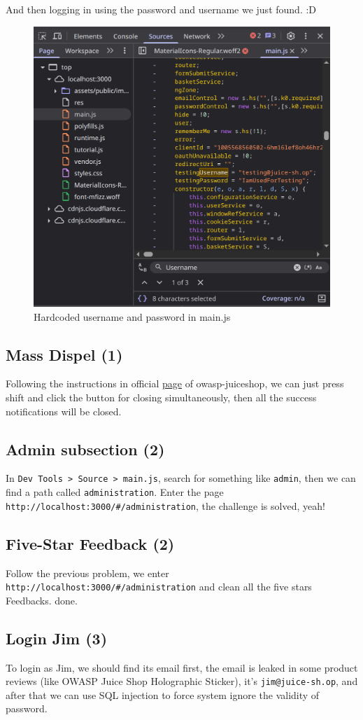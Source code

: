 \documentclass[12pt]{article}
\begin{document}
And then logging in using the password and username we just found. :D
\begin{figure}[H]
    \centering
    \includegraphics[width=0.5\linewidth]{images/5.png}
    \caption{Hardcoded username and password in main.js}
\end{figure}

\subsection{Mass Dispel (1)}
Following the instructions in official \href{https://pwning.owasp-juice.shop/companion-guide/latest/part1/challenges.html#_success_notifications}{page} of owasp-juiceshop, we can just press shift and click the button for closing simultaneously, then all the success notifications will be closed. 

\subsection{Admin subsection (2)}
In \texttt{Dev Tools > Source > main.js}, search for something like \texttt{admin}, then we can find a path called \texttt{administration}. Enter the page \texttt{http://localhost:3000/\#/administration}, the challenge is solved, yeah!

\subsection{Five-Star Feedback (2)}
Follow the previous problem, we enter \texttt{http://localhost:3000/\#/administration} and clean all the five stars Feedbacks. done.

\subsection{Login Jim (3)}
To login as Jim, we should find its email first, the email is leaked in some product reviews (like OWASP Juice Shop Holographic Sticker), it's \texttt{jim@juice-sh.op}, and after that we can use SQL injection to force system ignore the validity of password.
\end{document}
